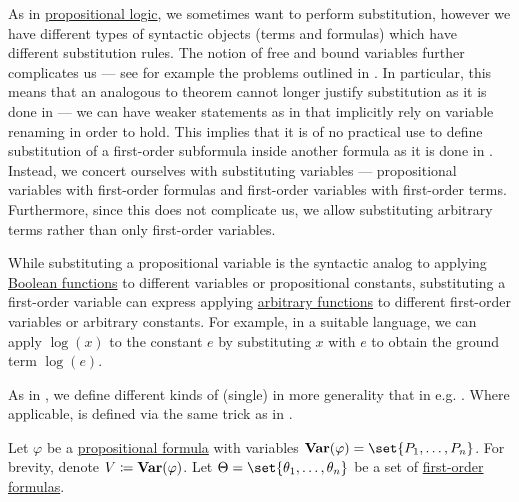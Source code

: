 \begin{definition}\label{def:first_order_substitution}
  As in \hyperref[subsec:propositional_logic]{propositional logic}, we sometimes want to perform substitution, however we have different types of syntactic objects (terms and formulas) which have different substitution rules. The notion of free and bound variables further complicates us --- see for example the problems outlined in . In particular, this means that an analogous to  theorem cannot longer justify substitution as it is done in  --- we can have weaker statements as in  that implicitly rely on variable renaming in order to hold. This implies that it is of no practical use to define substitution of a first-order subformula inside another formula as it is done in . Instead, we concert ourselves with substituting variables --- propositional variables with first-order formulas and first-order variables with first-order terms. Furthermore, since this does not complicate us, we allow substituting arbitrary terms rather than only first-order variables.

  While substituting a propositional variable is the syntactic analog to applying \hyperref[def:boolean_function]{Boolean functions} to different variables or propositional constants, substituting a first-order variable can express applying \hyperref[def:function/single_valued]{arbitrary functions} to different first-order variables or arbitrary constants. For example, in a suitable language, we can apply \( \log(x) \) to the constant \( e \) by substituting \( x \) with \( e \) to obtain the ground term \( \log(e) \).

  As in , we define different kinds of (single)  in more generality that in e.g. \cite[def. 15.25]{OpenLogicFull}. Where applicable,  is defined via the same trick as in .

  \begin{thmenum}
     Let \( \varphi \) be a \hyperref[def:propositional_syntax/formula]{propositional formula} with variables \( \boldop{Var}(\varphi) = \set{ P_1, \ldots, P_n } \). For brevity, denote \( V \coloneqq \operatorname{\mathbf{Var}}(\varphi) \). Let \( \Theta = \set{ \theta_1, \ldots, \theta_n } \) be a set of \hyperref[def:first_order_syntax/formula]{first-order formulas}.


\end{thmenum}
\end{definition}
